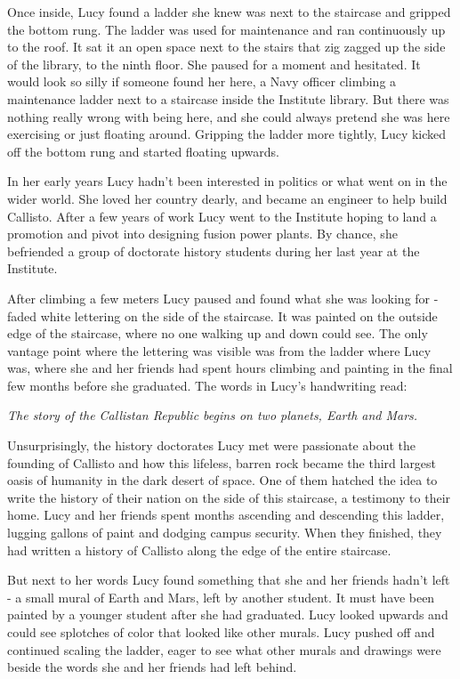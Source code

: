 \documentclass[12pt]{article} %
\begin{document}
Once inside, Lucy found a ladder she knew was next to the staircase and gripped the bottom rung. The ladder was used for maintenance and ran continuously up to the roof. It sat it an open space next to the stairs that zig zagged up the side of the library, to the ninth floor. She paused for a moment and hesitated. It would look so silly if someone found her here, a Navy officer climbing a maintenance ladder next to a staircase inside the Institute library. But there was nothing really wrong with being here, and she could always pretend she was here exercising or just floating around. Gripping the ladder more tightly, Lucy kicked off the bottom rung and started floating upwards.

In her early years Lucy hadn't been interested in politics or what went on in the wider world. She loved her country dearly, and became an engineer to help build Callisto. After a few years of work Lucy went to the Institute hoping to land a promotion and pivot into designing fusion power plants. By chance, she befriended a group of doctorate history students during her last year at the Institute.

After climbing a few meters Lucy paused and found what she was looking for - faded white lettering on the side of the staircase. It was painted on the outside edge of the staircase, where no one walking up and down could see. The only vantage point where the lettering was visible was from the ladder where Lucy was, where she and her friends had spent hours climbing and painting in the final few months before she graduated. The words in Lucy's handwriting read:

\textit{The story of the Callistan Republic begins on two planets, Earth and Mars.}

Unsurprisingly, the history doctorates Lucy met were passionate about the founding of Callisto and how this lifeless, barren rock became the third largest oasis of humanity in the dark desert of space. One of them hatched the idea to write the history of their nation on the side of this staircase, a testimony to their home. Lucy and her friends spent months ascending and descending this ladder, lugging gallons of paint and dodging campus security. When they finished, they had written a history of Callisto along the edge of the entire staircase.

But next to her words Lucy found something that she and her friends hadn't left - a small mural of Earth and Mars, left by another student. It must have been painted by a younger student after she had graduated. Lucy looked upwards and could see splotches of color that looked like other murals. Lucy pushed off and continued scaling the ladder, eager to see what other murals and drawings were beside the words she and her friends had left behind.
\end{document}
